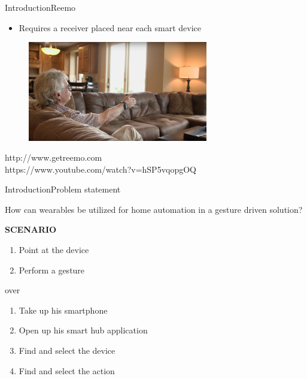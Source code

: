 \begin{frame}{Introduction}{Reemo}
\begin{itemize}
\item Requires a receiver placed near each smart device
\end{itemize}
\centering
\begin{figure}
  \includegraphics[width=0.7\textwidth]{images/reemo}
\end{figure}
{\tiny http://www.getreemo.com \\ https://www.youtube.com/watch?v=hSP5vqopgOQ}
\end{frame}

\begin{frame}{Introduction}{Problem statement}
\begin{center}
How can wearables be utilized for home automation in a gesture driven solution?
\end{center}
\vfill
\hspace{0.1cm} {\color{black} \textbf{SCENARIO}}
\begin{tcolorbox}
\noindent
\begin{minipage}{0.40\textwidth}
\begin{enumerate}
  \item Point at the device
  \item Perform a gesture
\end{enumerate}
\end{minipage}
\hfill
\begin{minipage}{0.15\textwidth}
\centering
over
\end{minipage}
\hfill
\begin{minipage}{0.40\textwidth}
\begin{enumerate}
  \item Take up his smartphone
  \item Open up his smart hub application
  \item Find and select the device
  \item Find and select the action
\end{enumerate}
\end{minipage}
\end{tcolorbox}
\end{frame}


